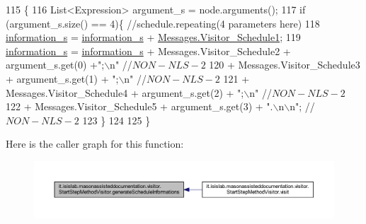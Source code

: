 \begin{DoxyCode}
115                                                                      \{
116         List<Expression> argument\_s = node.arguments();
117         \textcolor{keywordflow}{if} (argument\_s.size() == 4)\{    \textcolor{comment}{//schedule.repeating(4 parameters here)}
118             \hyperlink{classit_1_1isislab_1_1masonassisteddocumentation_1_1visitor_1_1_code_visitor_a628ab846d2f4de647f171060ebe73774}{information\_s} = \hyperlink{classit_1_1isislab_1_1masonassisteddocumentation_1_1visitor_1_1_code_visitor_a628ab846d2f4de647f171060ebe73774}{information\_s} + 
      \hyperlink{classit_1_1isislab_1_1masonassisteddocumentation_1_1visitor_1_1_messages_ac61d1feeb17b84bebc8eb84a49532bb7}{Messages.Visitor\_Schedule1};
119             \hyperlink{classit_1_1isislab_1_1masonassisteddocumentation_1_1visitor_1_1_code_visitor_a628ab846d2f4de647f171060ebe73774}{information\_s} = \hyperlink{classit_1_1isislab_1_1masonassisteddocumentation_1_1visitor_1_1_code_visitor_a628ab846d2f4de647f171060ebe73774}{information\_s} + Messages.Visitor\_Schedule2 + 
      argument\_s.get(0) +\textcolor{stringliteral}{";\(\backslash\)n"} \textcolor{comment}{//$NON-NLS-2$}
120                                 + Messages.Visitor\_Schedule3 + argument\_s.get(1) + \textcolor{stringliteral}{";\(\backslash\)n"} \textcolor{comment}{//$NON-NLS-2$}
121                                 + Messages.Visitor\_Schedule4 + argument\_s.get(2) + \textcolor{stringliteral}{";\(\backslash\)n"} \textcolor{comment}{//$NON-NLS-2$}
122                                 + Messages.Visitor\_Schedule5 + argument\_s.get(3) + \textcolor{stringliteral}{".\(\backslash\)n\(\backslash\)n"}; \textcolor{comment}{//$NON-NLS-2$}
123         \}
124         
125     \}
\end{DoxyCode}


Here is the caller graph for this function\-:\nopagebreak
\begin{figure}[H]
\begin{center}
\leavevmode
\includegraphics[width=350pt]{classit_1_1isislab_1_1masonassisteddocumentation_1_1visitor_1_1_start_step_method_visitor_a70d875f061a61b2a52bc3c3715d5a2c7_icgraph}
\end{center}
\end{figure}


